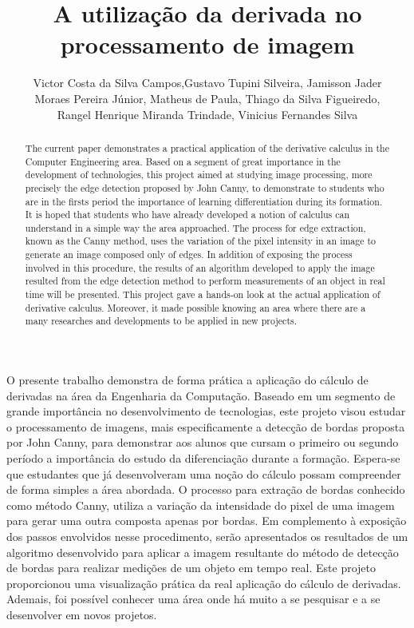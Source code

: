 \documentclass[12pt]{article}
\title{A utilização da derivada no processamento de imagem}
\author{Victor Costa da Silva Campos\inst{2},Gustavo Tupini Silveira\inst{1}, Jamisson Jader \\ Moraes Pereira Júnior\inst{1}, Matheus de Paula\inst{1}, Thiago da Silva Figueiredo,\\Rangel Henrique Miranda Trindade\inst{1}, Vinicius Fernandes Silva\inst{1} }
\begin{document}
 
	
	\maketitle
	
	\begin{abstract}
		The current paper demonstrates a practical application of the derivative calculus in the Computer Engineering area. Based on a segment of great importance in the development of technologies, this project aimed at studying image processing, more precisely the edge detection proposed by John Canny, to demonstrate to students who are in the firsts period the importance of learning differentiation during its formation. It is hoped that students who have already developed a notion of calculus can understand in a simple way the area approached. The process for edge extraction, known as the Canny method, uses the variation of the pixel intensity in an image to generate an image composed only of edges. In addition of exposing the process involved in this procedure, the results of an algorithm developed to apply the image resulted from the edge detection method to perform measurements of an object in real time will be presented. This project gave a hands-on look at the actual application of derivative calculus. Moreover, it made possible knowing an area where there are a many researches and developments to be applied in new projects.
	\end{abstract}
	
	\begin{resumo} 
		O presente trabalho demonstra de forma prática a aplicação do cálculo de derivadas na área da Engenharia da Computação. Baseado em um segmento de grande importância no desenvolvimento de tecnologias, este projeto visou estudar o processamento de imagens, mais especificamente a detecção de bordas proposta por John Canny, para demonstrar aos alunos que cursam o primeiro ou segundo período a importância do estudo da diferenciação durante a formação. Espera-se que estudantes que já desenvolveram uma noção do cálculo possam compreender de forma simples a área abordada. O processo para extração de bordas conhecido como método Canny, utiliza a variação da intensidade do pixel de uma imagem para gerar uma outra composta apenas por bordas. Em complemento à exposição dos passos envolvidos nesse procedimento, serão apresentados os resultados de um algoritmo desenvolvido para aplicar a imagem resultante do método de detecção de bordas para realizar medições de um objeto em tempo real. Este projeto proporcionou uma visualização prática da real aplicação do cálculo de derivadas. Ademais, foi possível conhecer uma área onde há muito a se pesquisar e a se desenvolver em novos projetos. 
	\end{resumo}
	
\end{document}
